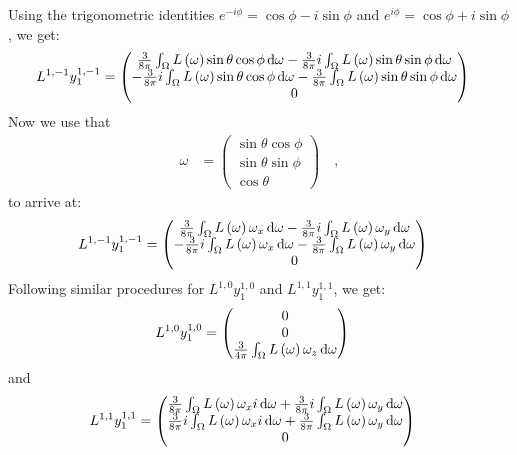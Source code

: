 Using the trigonometric identities $e^{-i\phi} = \operatorname{cos}\phi - i\operatorname{sin}\phi$ and $e^{i\phi} = \operatorname{cos}\phi + i\operatorname{sin}\phi$, we get:
\begin{align}
L^{1,-1}y^{1,-1}_1 &= 
\begin{pmatrix}
\frac{3}{8\pi}\int_\Omega{L\left(\omega\right)\operatorname{sin}\theta\operatorname{cos}\phi\,\mathrm{d}\omega} - \frac{3}{8\pi}i\int_\Omega{L\left(\omega\right)\operatorname{sin}\theta\operatorname{sin}\phi\,\mathrm{d}\omega}
\\
-\frac{3}{8\pi}i\int_\Omega{L\left(\omega\right)\operatorname{sin}\theta\operatorname{cos}\phi\,\mathrm{d}\omega} - \frac{3}{8\pi}\int_\Omega{L\left(\omega\right)\operatorname{sin}\theta\operatorname{sin}\phi\,\mathrm{d}\omega}
\\
0
\end{pmatrix}
\end{align}
Now we use that
\begin{align}
\omega &= 
\begin{pmatrix}
\operatorname{sin}\theta\operatorname{cos}\phi
\\
\operatorname{sin}\theta\operatorname{sin}\phi
\\
\operatorname{cos}\theta
\end{pmatrix}\quad,
\end{align}
to arrive at:
\begin{align}
L^{1,-1}y^{1,-1}_1 &= 
\begin{pmatrix}
\frac{3}{8\pi}\int_\Omega{L\left(\omega\right)\omega_x\,\mathrm{d}\omega} - \frac{3}{8\pi}i\int_\Omega{L\left(\omega\right)\omega_y\,\mathrm{d}\omega}
\\
-\frac{3}{8\pi}i\int_\Omega{L\left(\omega\right)\omega_x\,\mathrm{d}\omega} - \frac{3}{8\pi}\int_\Omega{L\left(\omega\right)\omega_y\,\mathrm{d}\omega}
\\
0
\end{pmatrix}
\end{align}
Following similar procedures for $L^{1,0}y^{1,0}_1$ and $L^{1,1}y^{1,1}_1$, we get:
\begin{align}
L^{1,0}y^{1,0}_1 &= 
\begin{pmatrix}
0\\
0\\
\frac{3}{4\pi}\int_\Omega{L\left(\omega\right)\omega_z\,\mathrm{d}\omega}
\end{pmatrix}
\end{align}
and
\begin{align}
L^{1,1}y^{1,1}_1 &= 
\begin{pmatrix}
\frac{3}{8\pi}\int_\Omega{L\left(\omega\right)\omega_xi\,\mathrm{d}\omega} + \frac{3}{8\pi}i\int_\Omega{L\left(\omega\right)\omega_y\,\mathrm{d}\omega}
\\
\frac{3}{8\pi}i\int_\Omega{L\left(\omega\right)\omega_xi\,\mathrm{d}\omega} + \frac{3}{8\pi}\int_\Omega{L\left(\omega\right)\omega_y\,\mathrm{d}\omega}
\\
0
\end{pmatrix}
\end{align}
